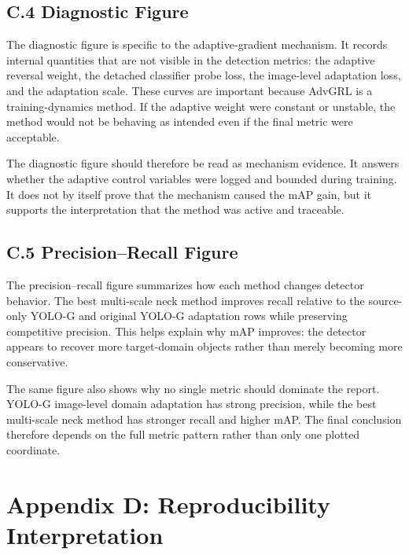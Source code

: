\documentclass[
  11pt,
]{article}
\begin{document}
\hypertarget{c.4-diagnostic-figure}{%
\subsection{C.4 Diagnostic Figure}\label{c.4-diagnostic-figure}}

The diagnostic figure is specific to the adaptive-gradient mechanism. It
records internal quantities that are not visible in the detection
metrics: the adaptive reversal weight, the detached classifier probe
loss, the image-level adaptation loss, and the adaptation scale. These
curves are important because AdvGRL is a training-dynamics method. If
the adaptive weight were constant or unstable, the method would not be
behaving as intended even if the final metric were acceptable.

The diagnostic figure should therefore be read as mechanism evidence. It
answers whether the adaptive control variables were logged and bounded
during training. It does not by itself prove that the mechanism caused
the mAP gain, but it supports the interpretation that the method was
active and traceable.

\hypertarget{c.5-precisionrecall-figure}{%
\subsection{C.5 Precision--Recall
Figure}\label{c.5-precisionrecall-figure}}

The precision--recall figure summarizes how each method changes detector
behavior. The best multi-scale neck method improves recall relative to
the source-only YOLO-G and original YOLO-G adaptation rows while
preserving competitive precision. This helps explain why mAP improves:
the detector appears to recover more target-domain objects rather than
merely becoming more conservative.

The same figure also shows why no single metric should dominate the
report. YOLO-G image-level domain adaptation has strong precision, while
the best multi-scale neck method has stronger recall and higher mAP. The
final conclusion therefore depends on the full metric pattern rather
than only one plotted coordinate.

\hypertarget{appendix-d-reproducibility-interpretation}{%
\section{Appendix D: Reproducibility
Interpretation}\label{appendix-d-reproducibility-interpretation}}
\end{document}
